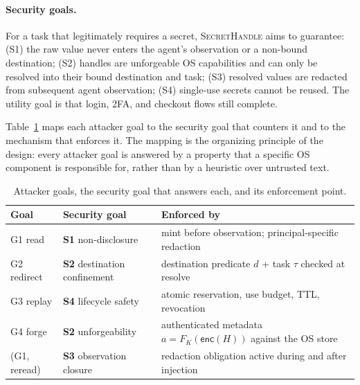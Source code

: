\documentclass[sigconf,10pt]{acmart}
\newcommand{\SH}{\textsc{SecretHandle}}
\newcommand{\enc}{\ensuremath{\mathsf{enc}}}
\theoremstyle{acmplain}%
\begin{document}
\paragraph{Security goals.} For a task that legitimately requires a secret, \SH{} aims to guarantee: (S1) the raw value never enters the agent's observation or a non-bound destination; (S2) handles are unforgeable OS capabilities and can only be resolved into their bound destination and task; (S3) resolved values are redacted from subsequent agent observation; (S4) single-use secrets cannot be reused. The utility goal is that login, 2FA, and checkout flows still complete.

Table~\ref{tab:goals} maps each attacker goal to the security goal that counters it and to the mechanism that enforces it. The mapping is the organizing principle of the design: every attacker goal is answered by a property that a specific OS component is responsible for, rather than by a heuristic over untrusted text.

\begin{table}[t]
\centering
\caption{Attacker goals, the security goal that answers each, and its enforcement point.}
\label{tab:goals}
\footnotesize
\renewcommand{\arraystretch}{1.08}
\begin{tabularx}{\columnwidth}{@{}>{\raggedright\arraybackslash}p{1.35cm}>{\raggedright\arraybackslash}p{2.15cm}>{\raggedright\arraybackslash}X@{}}
\toprule
Goal & Security goal & Enforced by \\
\midrule
G1 read & \textbf{S1} non-disclosure & mint before observation; principal-specific redaction \\
G2 redirect & \textbf{S2} destination confinement & destination predicate $d$ + task $\tau$ checked at resolve \\
G3 replay & \textbf{S4} lifecycle safety & atomic reservation, use budget, TTL, revocation \\
G4 forge & \textbf{S2} unforgeability & authenticated metadata $a=F_K(\enc(H))$ against the OS store \\
(G1, reread) & \textbf{S3} observation closure & redaction obligation active during and after injection \\
\bottomrule
\end{tabularx}
\end{table}
\end{document}
